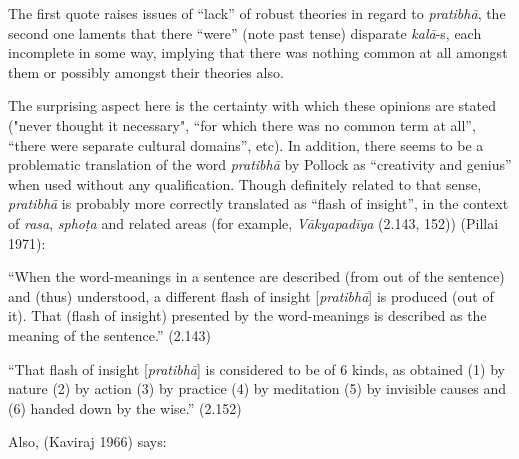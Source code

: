 The first quote raises issues of “lack” of robust theories in regard to \textsl{pratibhā}, the second one laments that there “were” (note past tense) disparate \textsl{kalā}-s, each incomplete in some way, implying that there was nothing common at all amongst them or possibly amongst their theories also.

The surprising aspect here is the certainty with which these opinions are stated ("never thought it necessary", “for which there was no common term at all”, “there were separate cultural domains”, etc). In addition, there seems to be a problematic translation of the word \textsl{pratibhā} by Pollock as “creativity and genius” when used without any qualification. Though definitely related to that sense, \textsl{pratibhā} is probably more correctly translated as “flash of insight”, in the context of \textsl{rasa}, \textsl{sphoṭa} and related areas (for example, \textsl{Vākyapadīya} (2.143, 152)) (Pillai 1971):

“When the word-meanings in a sentence are described (from out of the sentence) and (thus) understood, a different flash of insight [\textsl{pratibhā}] is produced (out of it). That (flash of insight) presented by the word-meanings is described as the meaning of the sentence.” (2.143)

“That flash of insight [\textsl{pratibhā}] is considered to be of 6 kinds, as obtained (1) by nature (2) by action (3) by practice (4) by meditation (5) by invisible causes and (6) handed down by the wise.” (2.152)

Also, (Kaviraj 1966) says:

